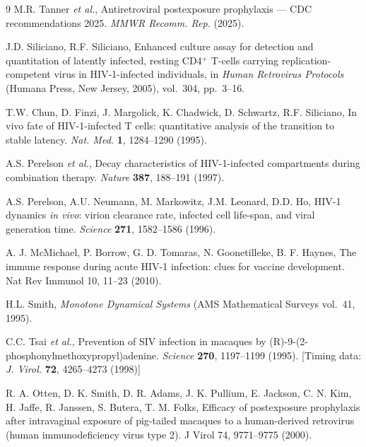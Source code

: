 \documentclass[11pt]{article}
\theoremstyle{definition}
\theoremstyle{remark}
\begin{document}
\renewcommand{\refname}{\large\textbf{Supplementary References}}

\begin{thebibliography}{9}
M.R. Tanner \textit{et al.}, Antiretroviral postexposure prophylaxis --- CDC recommendations 2025. \textit{MMWR Recomm. Rep.} (2025).

J.D. Siliciano, R.F. Siliciano, Enhanced culture assay for detection and quantitation of latently infected, resting CD4$^{+}$ T-cells carrying replication-competent virus in HIV-1-infected individuals, in \textit{Human Retrovirus Protocols} (Humana Press, New Jersey, 2005), vol.~304, pp.~3--16.

T.W. Chun, D. Finzi, J. Margolick, K. Chadwick, D. Schwartz, R.F. Siliciano, In vivo fate of HIV-1-infected T cells: quantitative analysis of the transition to stable latency. \textit{Nat. Med.} \textbf{1}, 1284--1290 (1995).

A.S. Perelson \textit{et al.}, Decay characteristics of HIV-1-infected compartments during combination therapy. \textit{Nature} \textbf{387}, 188--191 (1997).

A.S. Perelson, A.U. Neumann, M. Markowitz, J.M. Leonard, D.D. Ho, HIV-1 dynamics \textit{in vivo}: virion clearance rate, infected cell life-span, and viral generation time. \textit{Science} \textbf{271}, 1582--1586 (1996).

A. J. McMichael, P. Borrow, G. D. Tomaras, N. Goonetilleke, B. F. Haynes, The immune response during acute HIV-1 infection: clues for vaccine development. Nat Rev Immunol 10, 11–23 (2010).

H.L. Smith, \textit{Monotone Dynamical Systems} (AMS Mathematical Surveys vol.~41, 1995).

C.C. Tsai \textit{et al.}, Prevention of SIV infection in macaques by (R)-9-(2-phosphonylmethoxypropyl)adenine. \textit{Science} \textbf{270}, 1197--1199 (1995). [Timing data: \textit{J. Virol.} \textbf{72}, 4265--4273 (1998)]

R. A. Otten, D. K. Smith, D. R. Adams, J. K. Pullium, E. Jackson, C. N. Kim, H. Jaffe, R. Janssen, S. Butera, T. M. Folks, Efficacy of postexposure prophylaxis after intravaginal exposure of pig-tailed macaques to a human-derived retrovirus (human immunodeficiency virus type 2). J Virol 74, 9771–9775 (2000).


\end{thebibliography}
\end{document}

